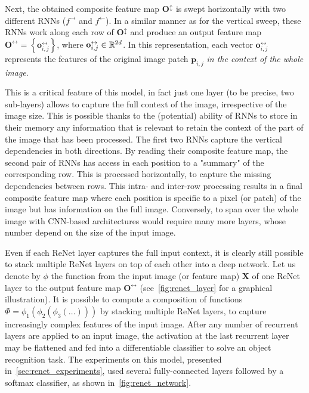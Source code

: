 Next, the obtained composite feature map $\mathbf{O}^\updownarrow$ is swept
horizontally with two different RNNs ($f^{\rightarrow}$ and $f^{\leftarrow}$).
In a similar manner as for the vertical sweep, these RNNs work along each row
of $\mathbf{O}^\updownarrow$ and produce an output feature map
$\mathbf{O}^\leftrightarrow = \left\{\mathbf{o}^\leftrightarrow_{i,j}
\right\}$, where $\mathbf{o}^\leftrightarrow_{i,j} \in \mathbb{R}^{2d}$. In this
representation, each vector $\mathbf{o}^\leftrightarrow_{i,j}$ represents the
features of the original image patch $\mathbf{p}_{i,j}$ \emph{in the context of
the whole image}.

This is a critical feature of this model, in fact just one layer (to be
precise, two sub-layers) allows to capture the full context of the image,
irrespective of the image size. This is possible thanks to the (potential)
ability of RNNs to store in their memory any information that is relevant to
retain the context of the part of the image that has been processed. The first
two RNNs capture the vertical dependencies in both directions. By reading
their composite feature map, the second pair of RNNs has access in each
position to a "summary" of the corresponding row. This is processed
horizontally, to capture the missing dependencies between rows. This intra- and
inter-row processing results in a final composite feature map where each
position is specific to a pixel (or patch) of the image but has information on
the full image. Conversely, to span over the whole image with CNN-based
architectures would require many more layers, whose number depend on the size
of the input image.

Even if each ReNet layer captures the full input context, it is clearly still
possible to stack multiple ReNet layers on top of each other into a deep
network. Let us denote by $\phi$ the function from the input image (or feature
map) $\mathbf{X}$ of one ReNet layer to the output feature map
$\mathbf{O}^\leftrightarrow$ (see~\autoref{fig:renet_layer} for a graphical
illustration). It is possible to compute a composition of functions $\Phi =
\phi_1(\phi_2(\phi_3(\dots)))$ by stacking multiple ReNet layers, to capture
increasingly complex features of the input image.  After any number of
recurrent layers are applied to an input image, the activation at the last
recurrent layer may be flattened and fed into a differentiable classifier to
solve an object recognition task. The experiments on this model, presented
in~\autoref{sec:renet_experiments}, used several fully-connected layers
followed by a softmax classifier, as shown in~\autoref{fig:renet_network}.

